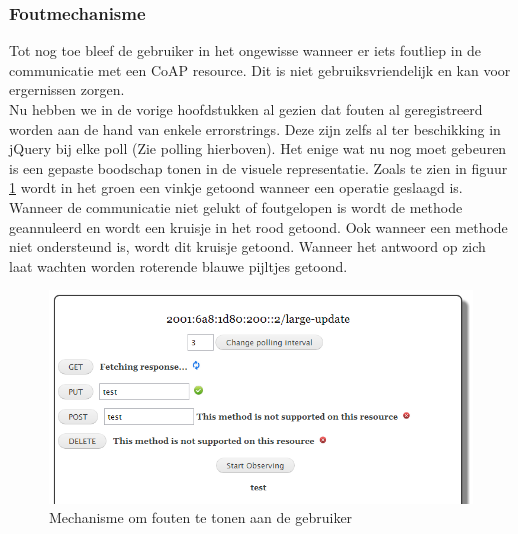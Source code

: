 \subsubsection{Foutmechanisme} \label{foutmechanisme}
Tot nog toe bleef de gebruiker in het ongewisse wanneer er iets foutliep in de communicatie met een CoAP resource. Dit is niet gebruiksvriendelijk en kan voor ergernissen zorgen.\\
Nu hebben we in de vorige hoofdstukken al gezien dat fouten al geregistreerd worden aan de hand van enkele errorstrings. Deze zijn zelfs al ter beschikking in jQuery bij elke poll (Zie polling hierboven). Het enige wat nu nog moet gebeuren is een gepaste boodschap tonen in de visuele representatie. Zoals te zien in figuur \ref{fig:foutmechanisme} wordt in het groen een vinkje getoond wanneer een operatie geslaagd is. Wanneer de communicatie niet gelukt of foutgelopen is wordt de methode geannuleerd en wordt een kruisje in het rood getoond. Ook wanneer een methode niet ondersteund is, wordt dit kruisje getoond. Wanneer het antwoord op zich laat wachten worden roterende blauwe pijltjes getoond.

\begin{figure}[h!]
\centering
\includegraphics[width=1\textwidth]{fig/foutmechanisme}
\caption{Mechanisme om fouten te tonen aan de gebruiker}
\label{fig:foutmechanisme}
\end{figure}

\newpage
